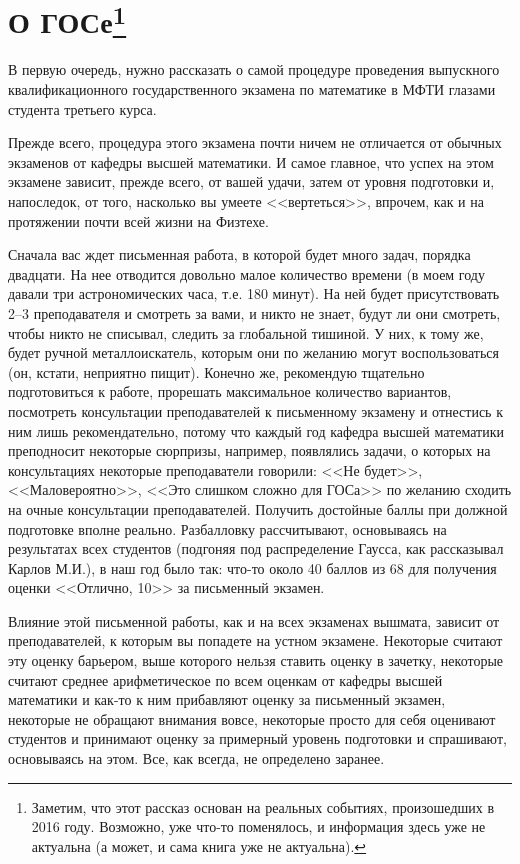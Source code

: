 \chapter[О ГОСе]{О ГОСе\footnote{Заметим, что этот рассказ основан на реальных событиях, произошедших в 2016 году. Возможно, уже что-то поменялось, и информация здесь уже не актуальна (а может, и сама книга уже не актуальна).}}

В первую очередь, нужно рассказать о самой процедуре проведения выпускного квалификационного государственного экзамена по математике в МФТИ глазами студента третьего курса. 

Прежде всего, процедура этого экзамена почти ничем не отличается от обычных экзаменов от кафедры высшей математики. 
И самое главное, что успех на этом экзамене зависит, прежде всего, от вашей удачи, затем от уровня подготовки и, напоследок, от того, насколько вы умеете <<вертеться>>, впрочем, как и на протяжении почти всей жизни на Физтехе.

Сначала вас ждет письменная работа, в которой будет много задач, порядка двадцати. На нее отводится довольно малое количество времени (в моем году давали три астрономических часа, т.е. 180 минут). На ней будет присутствовать 2--3 преподавателя и смотреть за вами, и никто не знает, будут ли они смотреть, чтобы никто не списывал, следить за глобальной тишиной. У них, к тому же, будет ручной металлоискатель, которым они по желанию могут воспользоваться (он, кстати, неприятно пищит). Конечно же, рекомендую тщательно подготовиться к работе, прорешать максимальное количество вариантов, посмотреть консультации преподавателей к письменному экзамену и отнестись к ним лишь рекомендательно, потому что каждый год кафедра высшей математики преподносит некоторые сюрпризы, например, появлялись задачи, о которых на консультациях некоторые преподаватели говорили: <<Не будет>>, <<Маловероятно>>, <<Это слишком сложно для ГОСа>> по желанию сходить на очные консультации преподавателей. Получить достойные баллы при должной подготовке вполне реально. Разбалловку рассчитывают, основываясь на результатах всех студентов (подгоняя под распределение Гаусса, как рассказывал Карлов М.И.), в наш год было так: что-то около 40 баллов из 68 для получения оценки <<Отлично, 10>> за письменный экзамен.

Влияние этой письменной работы, как и на всех экзаменах вышмата, зависит от преподавателей, к которым вы попадете на устном экзамене. Некоторые считают эту оценку барьером, выше которого нельзя ставить оценку в зачетку, некоторые считают среднее арифметическое по всем оценкам от кафедры высшей математики и как-то к ним прибавляют оценку за письменный экзамен, некоторые не обращают внимания вовсе, некоторые просто для себя оценивают студентов и принимают оценку за примерный уровень подготовки и спрашивают, основываясь на этом. Все, как всегда, не определено заранее.

